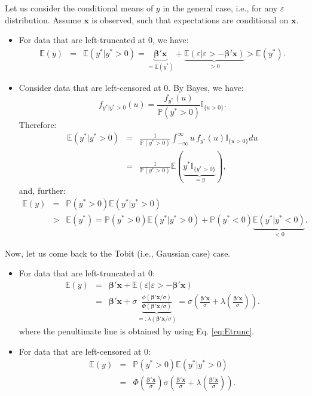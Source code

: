 \documentclass[
  12pt,
]{book}
\theoremstyle{definition}
\theoremstyle{definition}
\theoremstyle{definition}
\theoremstyle{definition}
\theoremstyle{remark}
\begin{document}
Let us consider the conditional means of \(y\) in the general case, i.e., for any \(\varepsilon\) distribution. Assume \(\mathbf{x}\) is observed, such that expectations are conditional on \(\mathbf{x}\).

\begin{itemize}
\item
  For data that are left-truncated at 0, we have:
  \begin{eqnarray*}
  \mathbb{E}(y) &=& \mathbb{E}(y^*|y^*>0) = \underbrace{\boldsymbol\beta'\mathbf{x}}_{=\mathbb{E}(y^*)} + \underbrace{\mathbb{E}(\varepsilon|\varepsilon>-\boldsymbol\beta'\mathbf{x})}_{>0} > \mathbb{E}(y^*).
  \end{eqnarray*}
\item
  Consider data that are left-censored at 0. By Bayes, we have:
  \[
  f_{y^*|y^*>0}(u) = \frac{f_{y^*}(u)}{\mathbb{P}(y^*>0)}\mathbb{I}_{\{u>0\}}.
  \]
  Therefore:
  \begin{eqnarray*}
  \mathbb{E}(y^*|y^*>0) &=& \frac{1}{\mathbb{P}(y^*>0)} \int_{-\infty}^\infty u\, f_{y^*}(u)\mathbb{I}_{\{u>0\}} du \\
  &=&  \frac{1}{\mathbb{P}(y^*>0)} \mathbb{E}(\underbrace{y^*\mathbb{I}_{\{y^*>0\}}}_{=y}),
  \end{eqnarray*}
  and, further:
  \begin{eqnarray*}
  \mathbb{E}(y) &=&  \mathbb{P}(y^*>0)\mathbb{E}(y^*|y^*>0)\\
  &>&  \mathbb{E}(y^*) =  \mathbb{P}(y^*>0)\mathbb{E}(y^*|y^*>0) +  \mathbb{P}(y^*<0)\underbrace{\mathbb{E}(y^*|y^*<0)}_{<0}.
  \end{eqnarray*}
\end{itemize}

Now, let us come back to the Tobit (i.e., Gaussian case) case.

\begin{itemize}
\item
  For data that are left-truncated at 0:
  \begin{eqnarray}
  \mathbb{E}(y) &=& \boldsymbol\beta'\mathbf{x} + \mathbb{E}(\varepsilon|\varepsilon>-\boldsymbol\beta'\mathbf{x}) \nonumber\\
  &=&  \boldsymbol\beta'\mathbf{x} + \sigma \underbrace{\frac{\phi(\boldsymbol\beta'\mathbf{x}/\sigma)}{\Phi(\boldsymbol\beta'\mathbf{x}/\sigma)}}_{=: \lambda(\boldsymbol\beta'\mathbf{x}/\sigma)} = \sigma \left( \frac{\boldsymbol\beta'\mathbf{x}}{\sigma} + \lambda\left(\frac{\boldsymbol\beta'\mathbf{x}}{\sigma}\right)\right). \label{eq:Econdtruncated}
  \end{eqnarray}
  where the penultimate line is obtained by using Eq. \eqref{eq:Etrunc}.
\item
  For data that are left-censored at 0:
  \begin{eqnarray*}
  \mathbb{E}(y) &=&  \mathbb{P}(y^*>0)\mathbb{E}(y^*|y^*>0)\\
  &=&  \Phi\left( \frac{\boldsymbol\beta'\mathbf{x}}{\sigma}\right) \sigma \left(
  \frac{\boldsymbol\beta'\mathbf{x}}{\sigma} +   \lambda\left(\frac{\boldsymbol\beta'\mathbf{x}}{\sigma}\right)
  \right).
  \end{eqnarray*}
\end{itemize}
\end{document}
